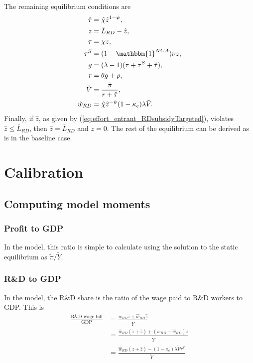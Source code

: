 \documentclass[11pt,english]{article}
\theoremstyle{definition}
\begin{document}
The remaining equilibrium conditions are
\begin{align}
\hat{\tau} &= \hat{\chi} \hat{z}^{1-\psi}, \\
z &= \bar{L}_{RD} - \hat{z}, \label{eq:labor_resource_constraint_RDsubsidyTargeted}\\ 
\tau &= \chi z ,\\
\tau^S &= (1-\mathbbm{1}^{NCA}) \nu z ,\\
g &= (\lambda - 1) (\tau + \tau^S + \hat{\tau}), \\
r &= \theta g + \rho ,\\
\tilde{V} &= \frac{\tilde{\pi}}{r + \hat{\tau}}, \\ 
\hat{w}_{RD} &= \hat{\chi} \hat{z}^{-\psi} (1-\kappa_e) \lambda \tilde{V}. \label{eq:wage_rd_labor_RDsubsidyTargeted}
\end{align}
Finally, if $\hat{z}$, as given by (\ref{eq:effort_entrant_RDsubsidyTargeted}), violates $\hat{z} \le \bar{L}_{RD}$, then $\hat{z} = \bar{L}_{RD}$ and $z = 0$. The rest of the equilibrium can be derived as is in the baseline case.


\section{Calibration}\label{appendix:calibration}

\subsection{Computing model moments}

\subsubsection{Profit to GDP}\label{appendix:calibration:profits/gdp}

In the model, this ratio is simple to calculate using the solution to the static equilibrium as $\tilde{\pi} / \tilde{Y}$.

\subsubsection{R\&D to GDP}\label{appendix:calibration:rd/gdp}

In the model, the R\&D share is the ratio of the wage paid to R\&D workers to GDP. This is
\begin{align*}
\frac{\textrm{R\&D wage bill}}{\textrm{GDP}} &= \frac{w_{RD} z + \hat{w}_{RD} \hat{z}}{\tilde{Y}} \\ 
&= \frac{\hat{w}_{RD} (z + \hat{z}) + (w_{RD} - \hat{w}_{RD})z}{\tilde{Y}} \\
&= \frac{\hat{w}_{RD} (z + \hat{z}) - (1-\kappa_e) \lambda \tilde{V} \tau^S}{\tilde{Y}}
\end{align*}
\end{document}
